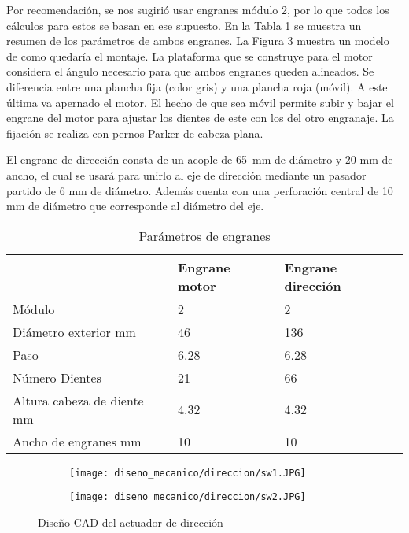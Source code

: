 Por recomendación, se nos sugirió usar engranes módulo 2, por lo que todos los cálculos para estos se basan en ese supuesto. En la Tabla \ref{engrane} se muestra un resumen de los parámetros de ambos engranes. La Figura \ref{eng} muestra un modelo de como quedaría el montaje. La plataforma que se construye para el motor considera el ángulo necesario para que ambos engranes queden alineados. Se diferencia entre una plancha fija (color gris) y una plancha roja (móvil). A este última va apernado el motor. El hecho de que sea móvil permite subir y bajar el engrane del motor para ajustar los dientes de este con los del otro engranaje. La fijación se realiza con pernos Parker de cabeza plana.

El engrane de dirección consta de un acople de \SI{65}{\milli\meter} de diámetro y 20 mm de ancho, el cual se usará para unirlo al eje de dirección mediante un pasador partido de 6 mm de diámetro. Además cuenta con una perforación central de 10 mm de diámetro que corresponde al diámetro del eje. 


\begin{table}
\centering


\begin{tabular}{l|l|l|}
\cline{2-3}
                                          & Engrane motor & Engrane dirección \\ \hline
\multicolumn{1}{|l|}{Módulo}              & 2             & 2                 \\ \hline
\multicolumn{1}{|l|}{Diámetro exterior \si{\milli\meter}} & 46      &  136    \\ \hline
\multicolumn{1}{|l|}{Paso}                & 6.28          & 6.28              \\ \hline
\multicolumn{1}{|l|}{Número Dientes}      & 21            & 66                \\ \hline
\multicolumn{1}{|l|}{Altura cabeza de diente \si{\milli\meter}} & 4.32  & 4.32\\ \hline
\multicolumn{1}{|l|}{Ancho de engranes \si{\milli\meter}} & 10 & 10            \\ \hline
\end{tabular}
\caption{Parámetros de engranes}
\label{engrane}
\end{table}

\begin{figure}[H]
\begin{center}
    \begin{subfigure}{0.4\textwidth}
        \texttt{[image: diseno\_mecanico/direccion/sw1.JPG]} 
        \label{sw11}
    \end{subfigure}
    \begin{subfigure}{0.4\textwidth}
        \texttt{[image: diseno\_mecanico/direccion/sw2.JPG]}
        \label{sw22}
    \end{subfigure}
    \caption{Diseño CAD del actuador de dirección}
    \label{eng}
\end{center}
\end{figure}

